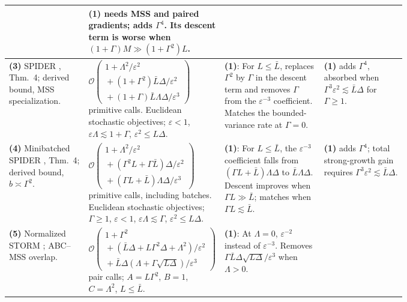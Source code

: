 \begin{table}[tp]
\begin{threeparttable}
\begin{tabularx}{\linewidth}{@{}>{\raggedright\arraybackslash}p{0.20\linewidth}>{\raggedright\arraybackslash}p{0.32\linewidth}>{\raggedright\arraybackslash}p{0.25\linewidth}>{\raggedright\arraybackslash}X@{}}
& \textbf{(1)} needs MSS and paired gradients; adds $\Gamma^4$. Its descent term is worse when $(1+\Gamma)M\gg(1+\Gamma^2)L$. \\
\midrule
\textbf{(3)} SPIDER \citep{avmsChenEtAl2023v2}, Thm.~4; derived bound, MSS specialization.
& $\mathcal{O}\!\left(\begin{gathered}1+\Lambda^2/\varepsilon^2\\ {}+(1+\Gamma^2)\bar L\Delta/\varepsilon^2\\ {}+(1+\Gamma)\bar L\Lambda\Delta/\varepsilon^3\end{gathered}\right)$ primitive calls. Euclidean stochastic objectives; $\varepsilon<1$, $\varepsilon\Lambda\lesssim1+\Gamma$, $\varepsilon^2\le L\Delta$.
& \textbf{(1)}: For $L\le\bar L$, replaces $\Gamma^2$ by $\Gamma$ in the descent term and removes $\Gamma$ from the $\varepsilon^{-3}$ coefficient. Matches the bounded-variance rate at $\Gamma=0$.
& \textbf{(1)} adds $\Gamma^4$, absorbed when $\Gamma^3\varepsilon^2\lesssim\bar L\Delta$ for $\Gamma\ge1$. \\
\midrule
\textbf{(4)} Minibatched SPIDER \citep{avmsChenEtAl2023v2}, Thm.~4; derived bound, $b\asymp\Gamma^2$.
& $\mathcal{O}\!\left(\begin{gathered}1+\Lambda^2/\varepsilon^2\\ {}+(\Gamma^2L+\Gamma\bar L)\Delta/\varepsilon^2\\ {}+(\Gamma L+\bar L)\Lambda\Delta/\varepsilon^3\end{gathered}\right)$ primitive calls, including batches. Euclidean stochastic objectives; $\Gamma\ge1$, $\varepsilon<1$, $\varepsilon\Lambda\lesssim\Gamma$, $\varepsilon^2\le L\Delta$.
& \textbf{(1)}: For $L\le\bar L$, the $\varepsilon^{-3}$ coefficient falls from $(\Gamma L+\bar L)\Lambda\Delta$ to $\bar L\Lambda\Delta$. Descent improves when $\Gamma L\gg\bar L$; matches when $\Gamma L\lesssim\bar L$.
& \textbf{(1)} adds $\Gamma^4$; total strong-growth gain requires $\Gamma^3\varepsilon^2\lesssim\bar L\Delta$. \\
\midrule
\textbf{(5)} Normalized STORM \citep{avmsNormalizedStormRepository}; ABC--MSS overlap.
& $\mathcal{O}\!\left(\begin{gathered}1+\Gamma^2\\ {}+(\bar L\Delta+L\Gamma^2\Delta+\Lambda^2)/\varepsilon^2\\ {}+\bar L\Delta(\Lambda+\Gamma\sqrt{L\Delta})/\varepsilon^3\end{gathered}\right)$ pair calls; $A=L\Gamma^2$, $B=1$, $C=\Lambda^2$, $L\le\bar L$.
& \textbf{(1)}: At $\Lambda=0$, $\varepsilon^{-2}$ instead of $\varepsilon^{-3}$. Removes $\Gamma\bar L\Delta\sqrt{L\Delta}/\varepsilon^3$ when $\Lambda>0$.

\end{tabularx}
\end{threeparttable}
\end{table}
